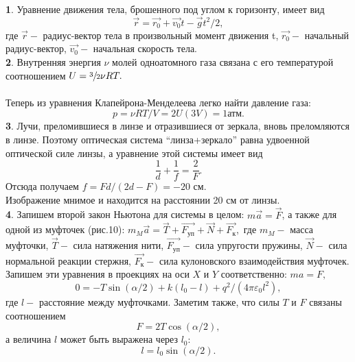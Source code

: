 \begin{multicols}{2}
\textbf{1}. Уравнение движения тела, брошенного под углом к горизонту, имеет вид
\vspace{-0.3cm}
$$\vec{r}=\vec{r_{0}}+\vec{v_{0}}t-\vec{g}t^{2}/2,$$
где $\vec{r} -$ радиус-вектор тела в произвольный момент движения t, $\vec{r_{0}} - $ начальный радиус-вектор, $\vec{v_{0}} - $ начальная скорость тела.\\
\textbf{2}. Внутренняя энергия $\nu$ молей одноатомного газа связана с его температурой соотношением
$U=\sfrac{3}{2}\nu RT.$\\\\
Теперь из уравнения Клапейрона-Менделеева легко найти давление газа:
\vspace{-0.3cm}
$$p=\nu RT/V=2U(3V)=1 \text{атм.}$$
\textbf{3}. Лучи, преломившиеся в линзе и отразившиеся от зеркала, вновь преломляются в линзе. Поэтому оптическая система ``линза+зеркало'' равна удвоенной оптической силе линзы, а уравнение этой системы имеет вид
\vspace{-0.3cm}
$$\frac{1}{d}+\frac{1}{f}=\frac{2}{F}.$$
Отсюда получаем $f=Fd/(2d-F)=-20 $ см.\\
Изображение мнимое и находится на расстоянии 20 см от линзы.\\
\textbf{4}. Запишем второй закон Ньютона для системы в целом:
$m\vec{a}=\vec{F}$, а также для одной из муфточек (рис.10):
$m_{M}\vec{a}=\vec{T}+\vec{F_{уп}}+\vec{N}+\vec{F_{к}},$
где $m_{M} - $ масса муфточки, $\vec{T} - $ сила натяжения нити, $\vec{F_{уп}}- $ сила упругости пружины, $\vec{N}- $ сила нормальной реакции стержня, $\vec{F_{к}}- $ сила кулоновского взаимодействия муфточек. Запишем эти уравнения в проекциях на оси $X$ и $Y$ соответственно:
$ma=F,$
\vspace{-0.3cm}
$$0=-T\sin(\alpha/2)+k(l_{0}-l)+q^{2}/(4\pi\varepsilon_{0}l^{2}),$$
где $l - $ расстояние между муфточками. Заметим также, что силы $T$ и $F$ связаны соотношением
$$F=2T\cos(\alpha/2),$$
а величина $l$ может быть выражена через $l_{0}$:
\vspace{-0.3cm}
$$l=l_{0}\sin(\alpha/2).$$
\end{multicols}
\newpage
